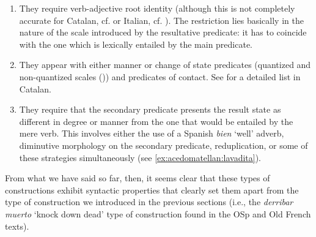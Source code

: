 \documentclass[output=paper,colorlinks,citecolor=brown,
]{langscibook}
\begin{document}



\begin{enumerate}
	\item They require verb-adjective root identity (although this is not completely accurate for Catalan, cf. \citealt{EspinalandMateu2018} or Italian, cf. \citealt{Napoli1992}). The restriction lies basically in the nature of the scale introduced by the resultative predicate: it has to coincide with the one which is lexically entailed by the main predicate.

	\item They appear with either manner or change of state predicates (quantized and non-quantized scales (\citealt{Beavers2011})) and predicates of contact. See \citet{EspinalandMateu2018} for a detailed list in Catalan.

	\item They require that the secondary predicate presents the result state as different in degree or manner from the one that would be entailed by the mere verb. This involves either the use of a Spanish \textit{bien}  `well’ adverb, diminutive morphology on the secondary predicate, reduplication, or some of these strategies simultaneously (see \ref{ex:acedomatellan:lavadita}).
\end{enumerate}\par

\noindent From what we have said so far, then, it seems clear that these types of constructions exhibit syntactic properties that clearly set them apart from the type of construction we introduced in the previous sections (i.e., the \textit{derribar muerto} `knock down dead' type of construction found in the OSp and Old French texts).  
\end{document}
